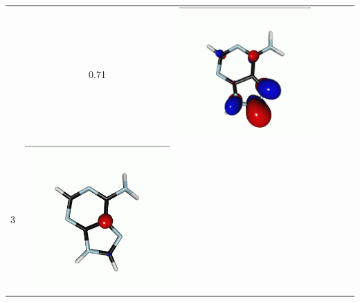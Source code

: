 \documentclass[journal=jctcce,manuscript=article]{achemso}
\begin{document}
\begin{table}[H]
\begin{tabular}{ l| c c c | c c c }
\begin{minipage}{0.2\textwidth}
    \end{minipage}
    & 0.71
    & 
    \begin{minipage}{0.2\textwidth}
        \centering
        \includegraphics[scale=0.10]{NTO/Adenine_C/2p_Cs.png}
    \end{minipage}
    \\
            3 &  
    \begin{minipage}{0.2\textwidth}
        \centering
        \includegraphics[scale=0.10]{NTO/Adenine_C/3h_C1.png}

\end{minipage}
\end{tabular}
\end{table}
\end{document}
